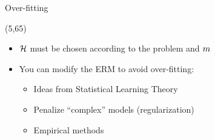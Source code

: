 \begin{frame}{Over-fitting}
\begin{textblock}{50}
\begin{center}
{      }
    \end{center}
  \end{textblock}

  \begin{textblock}{90}(5,65)
    \begin{itemize}
    \item<4-> $\mathcal{H}$ must be chosen according to the problem and
      $m$
    \item<5-> You can modify the \ac{ERM} to avoid over-fitting:
      \begin{itemize}
      \item Ideas from Statistical Learning Theory
      \item Penalize ``complex'' models (regularization)
      \item Empirical methods
      \end{itemize}
    \end{itemize}
  \end{textblock}
\end{frame}
